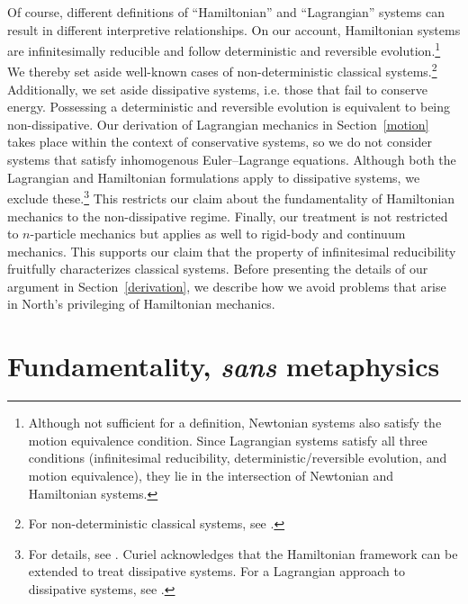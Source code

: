 \documentclass[12pt, twoside]{article}
\begin{document}
Of course, different definitions of ``Hamiltonian'' and ``Lagrangian'' systems can result in different interpretive relationships. On our account, Hamiltonian systems are infinitesimally reducible and follow deterministic and reversible evolution.\footnote{Although not sufficient for a definition, Newtonian systems also satisfy the motion equivalence condition. Since Lagrangian systems satisfy all three conditions (infinitesimal reducibility, deterministic/reversible evolution, and motion equivalence), they lie in the intersection of Newtonian and Hamiltonian systems.} We thereby set aside well-known cases of non-deterministic classical systems.\footnote{For non-deterministic classical systems, see \textcites*[3-4]{Baez}{Earman}{Norton}.} Additionally, we set aside dissipative systems, i.e. those that fail to conserve energy. Possessing a deterministic and reversible evolution is equivalent to being non-dissipative. Our derivation of Lagrangian mechanics in Section~\ref{motion} takes place within the context of conservative systems, so we do not consider systems that satisfy inhomogenous Euler--Lagrange equations. Although both the Lagrangian and Hamiltonian formulations apply to dissipative systems, we exclude these.\footnote{For details, see \textcites[\S 10.4]{Cline}. Curiel \parencites*[311]{Curiel} acknowledges that the Hamiltonian framework can be extended to treat dissipative systems. For a Lagrangian approach to dissipative systems, see \textcites[]{Smith}.} This restricts our claim about the fundamentality of Hamiltonian mechanics to the non-dissipative regime. Finally, our treatment is not restricted to $n$-particle mechanics but applies as well to rigid-body and continuum mechanics. This supports our claim that the property of infinitesimal reducibility fruitfully characterizes classical systems. Before presenting the details of our argument in Section~\ref{derivation}, we describe how we avoid problems that arise in North's privileging of Hamiltonian mechanics. 


\section{Fundamentality, \textit{sans} metaphysics}
\label{fundamentality}
\end{document}
